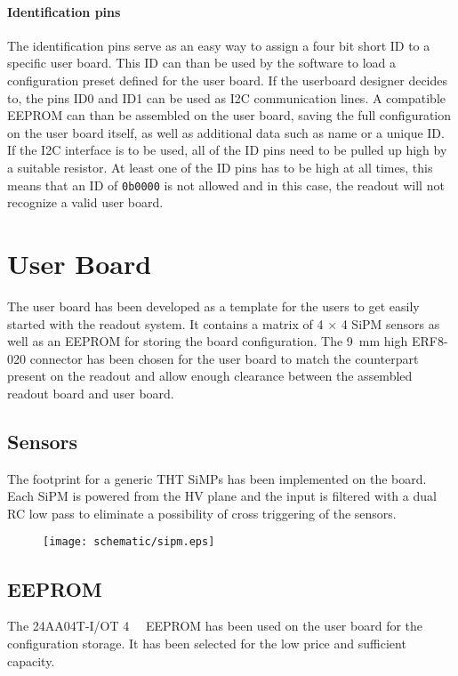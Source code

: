 \subsubsection{Identification pins}
The identification pins serve as an easy way to assign a four bit short ID to a specific user board. This ID can than be used by the software to load a configuration preset defined for the user board. If the userboard designer decides to, the pins ID0 and ID1 can be used as I2C communication lines. A compatible EEPROM can than be assembled on the user board, saving the full configuration on the user board itself, as well as additional data such as name or a unique ID. If the I2C interface is to be used, all of the ID pins need to be pulled up high by a suitable resistor. At least one of the ID pins has to be high at all times, this means that an ID of \verb|0b0000| is not allowed and in this case, the readout will not recognize a valid user board. 
%
\chapter{User Board}
The user board has been developed as a template for the users to get easily started with the readout system. It contains a matrix of 4 $\times$ 4 SiPM sensors as well as an EEPROM for storing the board configuration. The \SI{9}{\milli\meter} high ERF8-020 connector has been chosen for the user board to match the counterpart present on the readout and allow enough clearance between the assembled readout board and user board.

\section{Sensors}
The footprint for a generic THT SiMPs has been implemented on the board. Each SiPM is powered from the HV plane and the input is filtered with a dual RC low pass to eliminate a possibility of cross triggering of the sensors. 

\FloatBarrier
\begin{figure}[htp!]
    \centering
    \texttt{[image: schematic/sipm.eps]}
    \label{fig:sipm}
\end{figure}
\FloatBarrier

\section{EEPROM}
The 24AA04T-I/OT \SI{4}{\kilo\bit} EEPROM has been used on the user board for the configuration storage. It has been selected for the low price and sufficient capacity. 



